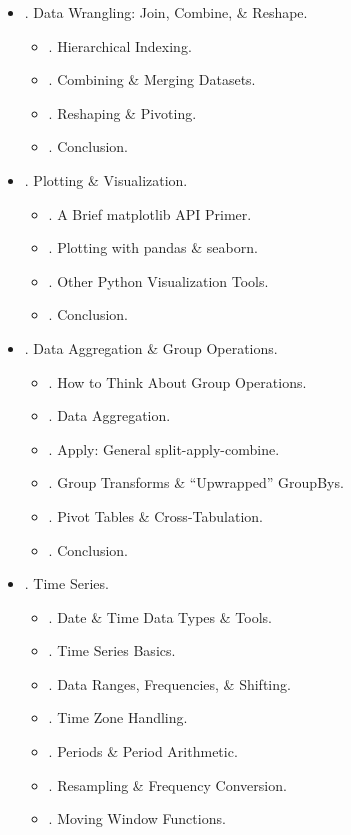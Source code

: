 \documentclass{article}
\begin{document}
\begin{enumerate}
\begin{itemize}
\begin{itemize}
		\end{itemize}
		\item {. Data Wrangling: Join, Combine, \& Reshape.}
		\begin{itemize}
			\item {. Hierarchical Indexing.}
			\item {. Combining \& Merging Datasets.}
			\item {. Reshaping \& Pivoting.}
			\item {. Conclusion.}
		\end{itemize}
		\item {. Plotting \& Visualization.}
		\begin{itemize}
			\item {. A Brief matplotlib API Primer.}
			\item {. Plotting with pandas \& seaborn.}
			\item {. Other Python Visualization Tools.}
			\item {. Conclusion.}
		\end{itemize}
		\item {. Data Aggregation \& Group Operations.}
		\begin{itemize}
			\item {. How to Think About Group Operations.}
			\item {. Data Aggregation.}
			\item {. Apply: General split-apply-combine.}
			\item {. Group Transforms \& ``Upwrapped'' GroupBys.}
			\item {. Pivot Tables \& Cross-Tabulation.}
			\item {. Conclusion.}
		\end{itemize}
		\item {. Time Series.}
		\begin{itemize}
			\item {. Date \& Time Data Types \& Tools.}
			\item {. Time Series Basics.}
			\item {. Data Ranges, Frequencies, \& Shifting.}
			\item {. Time Zone Handling.}
			\item {. Periods \& Period Arithmetic.}
			\item {. Resampling \& Frequency Conversion.}
			\item {. Moving Window Functions.}

\end{itemize}
\end{itemize}
\end{enumerate}
\end{document}
